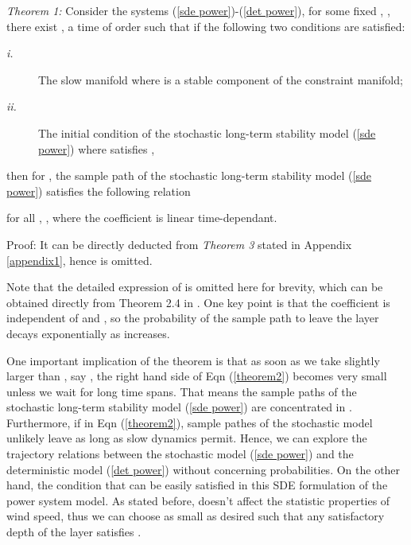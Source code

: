 \documentclass[journal]{IEEEtran}
\begin{document}
\textit{Theorem 1:} Consider the systems (\ref{sde power})-(\ref{det power}), for some fixed , , there exist , a time  of order  such that if the following two conditions are satisfied:

\begin{description}
\item [\textit{i.}] The slow manifold  where  is a stable component of the constraint manifold;
\item [\textit{ii.}] The initial condition  of the stochastic long-term stability model (\ref{sde power}) where  satisfies , \end{description}

then for , the sample path  of the stochastic long-term stability model (\ref{sde power}) satisfies  the following relation

for all , , where the coefficient  is linear time-dependant.

Proof: It can be directly deducted from \textit{Theorem 3} stated in Appendix \ref{appendix1}, hence is omitted.

Note that the detailed expression of  is omitted here for brevity, which can be obtained directly from Theorem 2.4 in \cite{Gentz:2003}. One key point is that the coefficient is independent of  and , so the probability of the sample path to leave the layer  decays exponentially as  increases. 


One important implication of the theorem is that as soon as we take  slightly larger than , say , the right hand side of Eqn (\ref{theorem2}) becomes very small unless we wait for long time spans. That means the sample paths of the stochastic long-term stability model (\ref{sde power}) are concentrated in . Furthermore, if  in Eqn (\ref{theorem2}), sample pathes of the stochastic model unlikely leave  as long as slow dynamics permit. Hence, we can explore the trajectory relations between the stochastic model (\ref{sde power}) and the deterministic model (\ref{det power}) without concerning probabilities.  On the other hand, the condition that  can be easily satisfied in this SDE formulation of the power system model. As stated before,  doesn't affect the statistic properties of wind speed, thus we can choose  as small as desired such that any satisfactory depth  of the layer satisfies .
\end{document}
